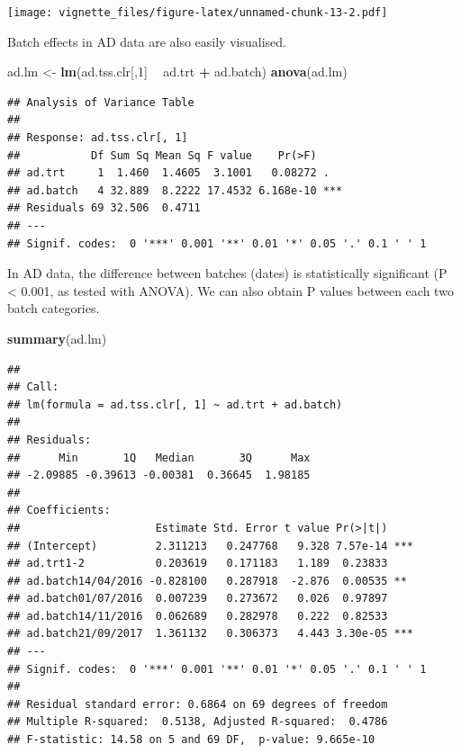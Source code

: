 \documentclass[]{book}
\newenvironment{Shaded}{\begin{snugshade}}{\end{snugshade}}
\newcommand{\KeywordTok}[1]{\textcolor[rgb]{0.13,0.29,0.53}{\textbf{#1}}}
\newcommand{\DecValTok}[1]{\textcolor[rgb]{0.00,0.00,0.81}{#1}}
\newcommand{\StringTok}[1]{\textcolor[rgb]{0.31,0.60,0.02}{#1}}
\newcommand{\OperatorTok}[1]{\textcolor[rgb]{0.81,0.36,0.00}{\textbf{#1}}}
\newcommand{\NormalTok}[1]{#1}
\begin{document}
\texttt{[image: vignette\_files/figure-latex/unnamed-chunk-13-2.pdf]}

Batch effects in AD data are also easily visualised.

\begin{Shaded}
\begin{Highlighting}[]
\NormalTok{ad.lm <-}\StringTok{ }\KeywordTok{lm}\NormalTok{(ad.tss.clr[,}\DecValTok{1}\NormalTok{] }\OperatorTok{~}\StringTok{ }\NormalTok{ad.trt }\OperatorTok{+}\StringTok{ }\NormalTok{ad.batch)}
\KeywordTok{anova}\NormalTok{(ad.lm)}
\end{Highlighting}
\end{Shaded}

\begin{verbatim}
## Analysis of Variance Table
## 
## Response: ad.tss.clr[, 1]
##           Df Sum Sq Mean Sq F value    Pr(>F)    
## ad.trt     1  1.460  1.4605  3.1001   0.08272 .  
## ad.batch   4 32.889  8.2222 17.4532 6.168e-10 ***
## Residuals 69 32.506  0.4711                      
## ---
## Signif. codes:  0 '***' 0.001 '**' 0.01 '*' 0.05 '.' 0.1 ' ' 1
\end{verbatim}

In AD data, the difference between batches (dates) is statistically
significant (P \textless{} 0.001, as tested with ANOVA). We can also
obtain P values between each two batch categories.

\begin{Shaded}
\begin{Highlighting}[]
\KeywordTok{summary}\NormalTok{(ad.lm)}
\end{Highlighting}
\end{Shaded}

\begin{verbatim}
## 
## Call:
## lm(formula = ad.tss.clr[, 1] ~ ad.trt + ad.batch)
## 
## Residuals:
##      Min       1Q   Median       3Q      Max 
## -2.09885 -0.39613 -0.00381  0.36645  1.98185 
## 
## Coefficients:
##                     Estimate Std. Error t value Pr(>|t|)    
## (Intercept)         2.311213   0.247768   9.328 7.57e-14 ***
## ad.trt1-2           0.203619   0.171183   1.189  0.23833    
## ad.batch14/04/2016 -0.828100   0.287918  -2.876  0.00535 ** 
## ad.batch01/07/2016  0.007239   0.273672   0.026  0.97897    
## ad.batch14/11/2016  0.062689   0.282978   0.222  0.82533    
## ad.batch21/09/2017  1.361132   0.306373   4.443 3.30e-05 ***
## ---
## Signif. codes:  0 '***' 0.001 '**' 0.01 '*' 0.05 '.' 0.1 ' ' 1
## 
## Residual standard error: 0.6864 on 69 degrees of freedom
## Multiple R-squared:  0.5138, Adjusted R-squared:  0.4786 
## F-statistic: 14.58 on 5 and 69 DF,  p-value: 9.665e-10
\end{verbatim}
\end{document}
